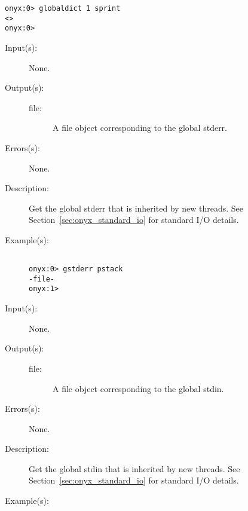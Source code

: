 \begin{description}
\begin{description}
\begin{verbatim}
onyx:0> globaldict 1 sprint
<>
onyx:0>
		\end{verbatim}
	\end{description}
\label{systemdict:gstderr}
\item[{\onyxop{--}{gstderr}{file}}: ]
	\begin{description}\item[]
	\item[Input(s): ] None.
	\item[Output(s): ]
		\begin{description}\item[]
		\item[file: ]
			A file object corresponding to the global stderr.
		\end{description}
	\item[Errors(s): ] None.
	\item[Description: ]
		Get the global stderr that is inherited by new threads.  See
		Section~\ref{sec:onyx_standard_io} for standard I/O details.
	\item[Example(s): ]\begin{verbatim}

onyx:0> gstderr pstack
-file-
onyx:1>
		\end{verbatim}
	\end{description}
\label{systemdict:gstdin}
\item[{\onyxop{--}{gstdin}{file}}: ]
	\begin{description}\item[]
	\item[Input(s): ] None.
	\item[Output(s): ]
		\begin{description}\item[]
		\item[file: ]
			A file object corresponding to the global stdin.
		\end{description}
	\item[Errors(s): ] None.
	\item[Description: ]
		Get the global stdin that is inherited by new threads.  See
		Section~\ref{sec:onyx_standard_io} for standard I/O details.
	\item[Example(s): ]\begin{verbatim}


\end{verbatim}
\end{description}
\end{description}
